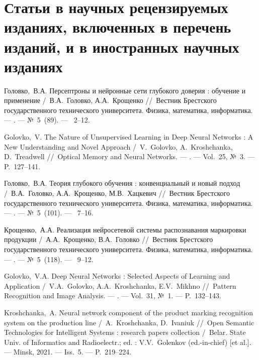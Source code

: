 \ifx\isabstract\undefined 
\section* {Статьи в научных рецензируемых изданиях, включенных в перечень изданий, и в иностранных научных изданиях}
\fi

Головко,~В.А. Персептроны и нейронные сети глубокого доверия : обучение и применение /~В.А.~Головко, А.А.~Крощенко
\newblock //~Вестник Брестского государственного технического университета. Физика, математика, информатика. ---
. ---
\newblock №~5~(89). ---
~2--12.

Golovko,~V. The Nature of Unsupervised Learning in Deep Neural Networks : A New Understanding and Novel Approach /~V.~Golovko, A.~Kroshchanka, D.~Treadwell
\newblock //~Optical Memory and Neural Networks. ---
. ---
\newblock Vol.~25, №~3. ---
\newblock P.~127--141.

Головко,~В.А. Теория глубокого обучения : конвенциальный и новый подход /~В.А.~Головко, А.А.~Крощенко, М.В.~Хацкевич
\newblock //~Вестник Брестского государственного технического университета. Физика, математика, информатика. ---
. ---
\newblock №~5~(101). ---
~7--16.

Крощенко,~А.А. Реализация нейросетевой системы распознавания маркировки продукции /~А.А.~Крощенко, В.А.~Головко
\newblock //~Вестник Брестского государственного технического университета. Физика, математика, информатика. ---
. ---
\newblock №~5~(118). ---
~9--12.

Golovko,~V.A.  Deep Neural Networks : Selected Aspects of Learning and Application /~V.A.~Golovko, A.A.~Kroshchanka, E.V.~Mikhno
\newblock //~Pattern Recognition and Image Analysis. ---
. ---
\newblock Vol.~31, №~1. ---
\newblock P.~132--143.

Kroshchanka,~A. Neural network component of the product marking recognition system on the production line /~A.~Kroshchanka, D.~Ivaniuk
\newblock //~Open Semantic Technologies for Intelligent Systems : research papers collection
\newblock /~Belar. State Univ. of Informatics and Radioelectr.; ed. : V.V.~Golenkov (ed.-in-chief) [et al.]. ---
\newblock Minsk, 2021. ---
\newblock Iss.~5. ---
\newblock P.~219--224.

